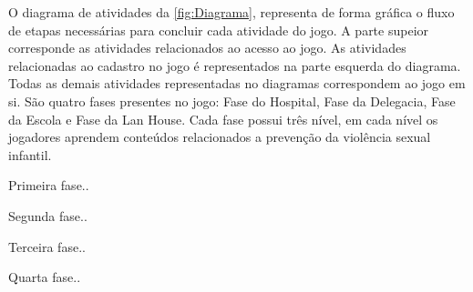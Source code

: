 O diagrama de atividades da \autoref{fig:Diagrama}, representa de forma gráfica o fluxo de etapas necessárias para concluir cada atividade do jogo. A parte supeior corresponde as atividades relacionados ao acesso ao jogo. As atividades relacionadas ao cadastro no jogo é representados na parte esquerda do diagrama. Todas as demais atividades representadas no diagramas correspondem ao jogo em si. São quatro fases presentes no jogo: Fase do Hospital, Fase da Delegacia, Fase da Escola e Fase da Lan House. Cada fase possui três nível, em cada nível os jogadores aprendem conteúdos relacionados a prevenção da violência sexual infantil. 




Primeira fase..

Segunda fase..

Terceira fase..

Quarta fase..

